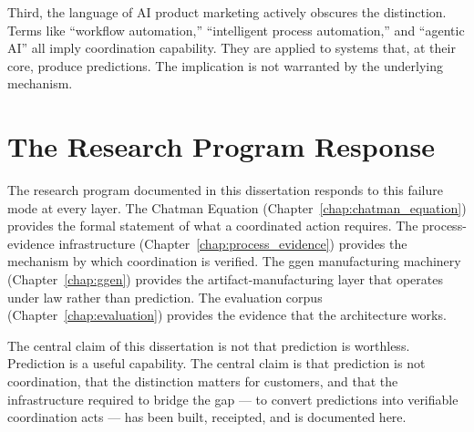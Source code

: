 Third, the language of AI product marketing actively obscures the distinction. Terms like ``workflow automation,'' ``intelligent process automation,'' and ``agentic AI'' all imply coordination capability. They are applied to systems that, at their core, produce predictions. The implication is not warranted by the underlying mechanism.

\section{The Research Program Response}

The research program documented in this dissertation responds to this failure mode at every layer. The Chatman Equation (Chapter~\ref{chap:chatman_equation}) provides the formal statement of what a coordinated action requires. The process-evidence infrastructure (Chapter~\ref{chap:process_evidence}) provides the mechanism by which coordination is verified. The ggen manufacturing machinery (Chapter~\ref{chap:ggen}) provides the artifact-manufacturing layer that operates under law rather than prediction. The evaluation corpus (Chapter~\ref{chap:evaluation}) provides the evidence that the architecture works.

The central claim of this dissertation is not that prediction is worthless. Prediction is a useful capability. The central claim is that prediction is not coordination, that the distinction matters for customers, and that the infrastructure required to bridge the gap --- to convert predictions into verifiable coordination acts --- has been built, receipted, and is documented here.
